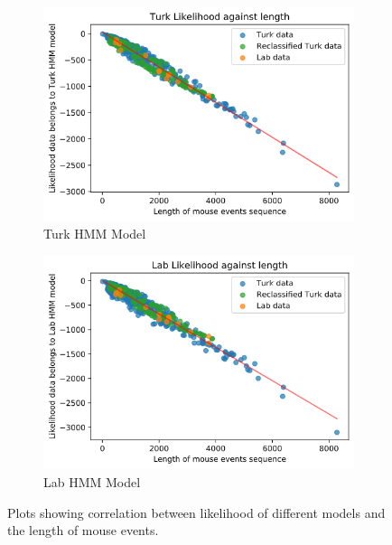 \documentclass{article}
\begin{document}
\begin{figure}[h!]
    \centering
    \begin{subfigure}[c]{0.4\linewidth}
        \centering
        \includegraphics[scale=0.4]{Images/Turk-Liklihood-Length.png}
        \caption{Turk HMM Model}
    \end{subfigure}    
    \hfill
    \begin{subfigure}[c]{0.4\linewidth}
        \centering
        \includegraphics[scale=0.4]{Images/Lab-Liklihood-Length.png}
        \caption{Lab HMM Model}
    \end{subfigure}  
    \caption{Plots showing correlation between likelihood of different models and the length of mouse events.}
    \label{fig:liklihoodlengths}
\end{figure}
\end{document}

